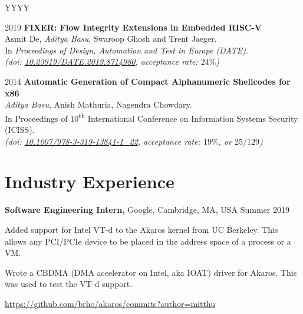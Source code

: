 \documentclass[margin]{res}
\newcommand{\doi}[1]{\href{http://dx.doi.org/#1}{#1}}
\begin{document}
\begin{resume}
\begin{labeling}{YYYY}
\item[2019]
    \textbf{FIXER: Flow Integrity Extensions in Embedded RISC-V}\\
    Asmit De, \emph{Aditya Basu}, Swaroop Ghosh and Trent Jaeger.\\
    In \emph{Proceedings of Design, Automation and Test in Europe (DATE)}.\\
    {\itshape (doi: \doi{10.23919/DATE.2019.8714980}, acceptance rate: $24\%$)}

\item[2014]
    \textbf{Automatic Generation of Compact Alphanumeric Shellcodes for x86}\\
    \emph{Aditya Basu}, Anish Mathuria, Nagendra Chowdary.\\
    In Proceedings of 10\textsuperscript{th} International Conference on Information Systems Security (ICISS).\\
    {\itshape (doi: \doi{10.1007/978-3-319-13841-1\_22}, acceptance rate: $19\%$, or $25/129$)}
\end{labeling}

\section{Industry Experience}

{\bf Software Engineering Intern,} Google, Cambridge, MA, USA
\hfill Summer  2019 %
\begin{itemizeexp}
    \item Added support for Intel VT-d to the Akaros kernel from UC Berkeley.
    This allows any PCI/PCIe device to be placed in the address space of a process or a VM.
    \item Wrote a CBDMA (DMA accelerator on Intel, aka IOAT) driver for Akaros.
    This was used to test the VT-d support.
    \item \url{https://github.com/brho/akaros/commits?author=mitthu}
\end{itemizeexp}


\end{resume}
\end{document}

